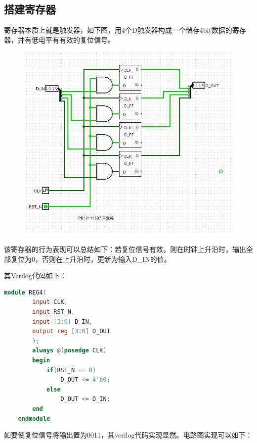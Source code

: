 \documentclass[UTF8]{article}
\begin{document}
	
	\subsection{搭建寄存器}
	寄存器本质上就是触发器，如下图，用4个D触发器构成一个储存4bit数据的寄存器，并有低电平有有效的复位信号。
	\begin{figure}[H]
		\centering
		\includegraphics[width=1\linewidth]{step5_register.jpg}
		\label{step5_register}
	\end{figure}
	该寄存器的行为表现可以总结如下：若复位信号有效，则在时钟上升沿时，输出全部复位为0，否则在上升沿时，更新为输入D\_IN的值。\par
	其Verilog代码如下：\par
	\begin{lstlisting}[language=Verilog]
	module REG4(
		input CLK,
		input RST_N,
		input [3:0] D_IN,
		output reg [3:0] D_OUT
		);
		always @(posedge CLK)
		begin
			if(RST_N == 0)
				D_OUT <= 4'b0;
			else
				D_OUT <= D_IN;
		end
	endmodule
	\end{lstlisting}
	如要使复位信号将输出置为0011，其verilog代码实现显然。电路图实现可以如下：
\end{document}
